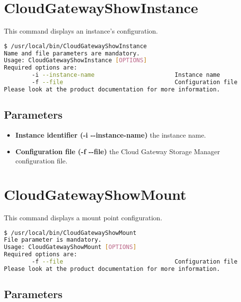 \documentclass[11pt,fleqn,openany]{book} %
\begin{document}
\clearpage

\section*{CloudGatewayShowInstance}
\label{sec:cloudgatewayshowinstance}

This command displays an instance's configuration.

\begin{lstlisting}[language=bash]
$ /usr/local/bin/CloudGatewayShowInstance
Name and file parameters are mandatory.
Usage: CloudGatewayShowInstance [OPTIONS]
Required options are:
        -i --instance-name                       Instance name
        -f --file                                Configuration file
Please look at the product documentation for more information.
\end{lstlisting}

\subsection*{Parameters}

\begin{itemize}
\item \textbf{Instance identifier (-i -{}-instance-name)} the instance name.

\item \textbf{Configuration file (-f -{}-file)} the Cloud Gateway Storage Manager configuration file.

\end{itemize}

\clearpage

\section*{CloudGatewayShowMount}
\label{sec:cloudgatewayshowmount}

This command displays a mount point configuration.

\begin{lstlisting}[language=bash]
$ /usr/local/bin/CloudGatewayShowMount
File parameter is mandatory.
Usage: CloudGatewayShowMount [OPTIONS]
Required options are:
        -f --file                                Configuration file
Please look at the product documentation for more information.
\end{lstlisting}

\subsection*{Parameters}
\end{document}
